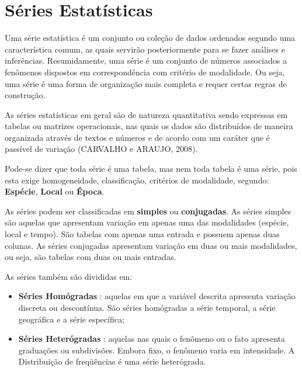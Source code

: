 














\newpage
\section{Séries Estatísticas}

Uma série estatística é um conjunto ou coleção de dados ordenados segundo uma característica comum, as quais servirão posteriormente para se fazer análises e inferências. Resumidamente, uma série é um conjunto de números associados a fenômenos dispostos em correspondência com critério de modalidade. Ou seja, uma série é uma forma de organização mais completa e requer certas regras de construção.\vskip0.3cm

As séries estatísticas em geral são de natureza quantitativa sendo expressas em tabelas ou matrizes operacionais, nas quais os dados são distribuídos de maneira organizada através de textos e números e de acordo com um caráter que é passível de variação (CARVALHO e ARAUJO, 2008).\vskip0.3cm

Pode-se dizer que toda série é uma tabela, mas nem toda tabela é
uma série, pois esta exige homogeneidade, classificação, critérios
de modalidade, segundo: \textbf{Espécie}, \textbf{Local} ou
\textbf{Época}. \vskip0.3cm

As séries podem ser classificadas em \textbf{simples} ou \textbf{conjugadas}. As séries simples são aquelas que apresentam variação em apenas uma das modalidades (espécie, local e tempo). São tabelas com apenas uma entrada e possuem apenas duas colunas. As séries conjugadas apresentam variação em duas ou mais modalidades, ou seja, são tabelas com duas ou mais entradas.\vskip0.3cm

As séries também são divididas em:


\begin{itemize}
  \item \textbf{Séries Homógradas} : aquelas em que a variável descrita apresenta variação discreta ou descontínua. São séries homógradas a série temporal, a série geográfica e a série específica;
 \item \textbf{Séries Heterógradas} : aquelas nas quais o fenômeno ou o fato apresenta graduações ou subdivisões. Embora fixo, o fenômeno varia em intensidade. A Distribuição de freqüências é uma série heterógrada.
\end{itemize}


